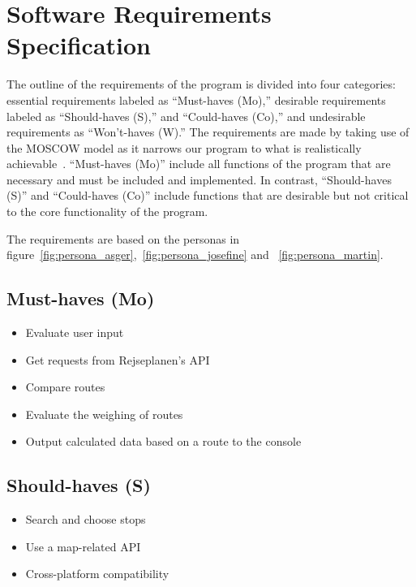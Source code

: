 \section{Software Requirements Specification}\label{sec:software-requirements-specification}

The outline of the requirements of the program is divided into four categories: essential requirements labeled as
``Must-haves (Mo),'' desirable requirements labeled as ``Should-haves (S),'' and ``Could-haves (Co),'' and
undesirable requirements as ``Won't-haves (W).''
The requirements are made by taking use of the MOSCOW model as it narrows our program to what is realistically
achievable~\cite{hudaib2018requirements}.
``Must-haves (Mo)'' include all functions of the program that are necessary and must be included and implemented. In
contrast, ``Should-haves (S)'' and ``Could-haves (Co)'' include functions that are desirable but not critical to
the core functionality of the program.

The requirements are based on the personas in figure~\ref{fig:persona_asger},~\ref{fig:persona_josefine} and
~\ref{fig:persona_martin}.

\subsection{Must-haves (Mo)}\label{subsec:must-haves}

\begin{itemize}
    \item Evaluate user input
    \item Get requests from Rejseplanen’s API
    \item Compare routes
    \item Evaluate the weighing of routes
    \item Output calculated data based on a route to the console
\end{itemize}

\subsection{Should-haves (S)}\label{subsec:should-haves}

\begin{itemize}
    \item Search and choose stops
    \item Use a map-related API
    \item Cross-platform compatibility
\end{itemize}

